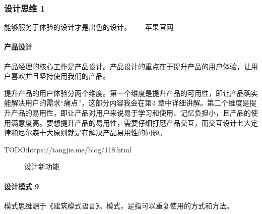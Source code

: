 \documentclass[letterpaper,11pt,english]{sphinxmanual}
\begin{document}
\subsubsection{设计思维 1\sphinxfootnotemark[381]}
\label{\detokenize{chapter_idea/design:id1}}\label{\detokenize{chapter_idea/design::doc}}%
\begin{footnotetext}[381]\sphinxAtStartFootnote
{}
%
\end{footnotetext}\ignorespaces 
能够服务于体验的设计才是出色的设计。——苹果官网


\paragraph{产品设计}
\label{\detokenize{chapter_idea/design:id2}}
产品经理的核心工作是产品设计。产品设计的重点在于提升产品的用户体验，让用户喜欢并且坚持使用我们的产品。

提升产品的用户体验分两个维度。第一个维度是提升产品的可用性，即让产品确实能解决用户的需求“痛点”，这部分内容我会在第4
章中详细讲解。第二个维度是提升产品的易用性，即让产品对用户来说易于学习和使用、记忆负担小，且产品的使用满意度高。要想提升产品的易用性，需要仔细打磨产品交互，而交互设计七大定律和尼尔森十大原则就是在解决产品易用性的问题。

TODO:https://tangjie.me/blog/118.html

\begin{figure}[H]
\centering
\capstart

\noindent{}
\caption{设计新功能\sphinxfootnotemark[382]}\label{\detokenize{chapter_idea/design:id12}}\end{figure}
%
\begin{footnotetext}[382]\sphinxAtStartFootnote
{}
%
\end{footnotetext}\ignorespaces 

\paragraph{设计模式 9\sphinxfootnotemark[383]}
\label{\detokenize{chapter_idea/design:id3}}%
\begin{footnotetext}[383]\sphinxAtStartFootnote
{}
%
\end{footnotetext}\ignorespaces 
模式思维源于《建筑模式语言》。模式，是指可以重复使用的方式和方法。
\end{document}

